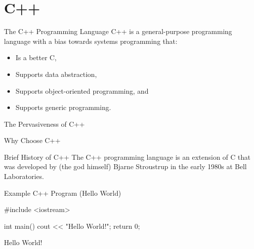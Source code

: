 \documentclass[../lecture1-introduction.tex]{subfiles}
\begin{document}
\section{C++}


\begin{frame}[fragile]{The C++ Programming Language}
    C++ is a general-purpose programming language with a bias towards systems
    programming that:
    \begin{itemize}
        \item Is a better C,
        \item Supports data abstraction,
        \item Supports object-oriented programming, and
        \item Supports generic programming.
    \end{itemize}
\end{frame}


\begin{frame}[fragile]{The Pervasiveness of C++}



\end{frame}


\begin{frame}[fragile]{Why Choose C++}



\end{frame}


\begin{frame}[fragile]{Brief History of C++}
    The C++ programming language is an extension of C that was developed by
    (the god himself) Bjarne Stroustrup in the early 1980s at Bell Laboratories.
\end{frame}


\begin{frame}[fragile]{Example C++ Program (Hello World)}
    \begin{cppcode}[]
#include <iostream>

int main()
{
    cout << "Hello World!";
    return 0;
}
    \end{cppcode}

    \begin{commandshell}
Hello World!
    \end{commandshell}
\end{frame}

\end{document}
